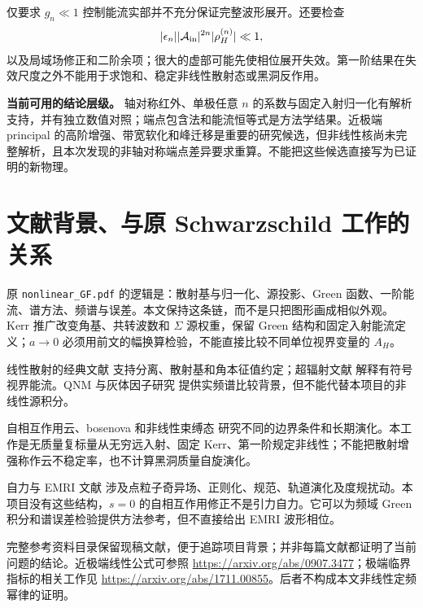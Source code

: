\documentclass[UTF8,fontset=fandol,11pt,a4paper,oneside]{ctexart}
\numberwithin{equation}{section}
\begin{document}
仅要求 $g_n\ll1$ 控制能流实部并不充分保证完整波形展开。还要检查
\begin{equation}
|\epsilon_n||\mathcal A_{\rm in}|^{2n}|\rho_H^{(n)}|\ll1,
\end{equation}
以及局域场修正和二阶余项；很大的虚部可能先使相位展开失效。第一阶结果在失效尺度之外不能用于求饱和、稳定非线性散射态或黑洞反作用。

\begin{note}
\textbf{当前可用的结论层级。} 轴对称红外、单极任意 $n$ 的系数与固定入射归一化有解析支持，并有独立数值对照；端点包含法和能流恒等式是方法学结果。近极端 principal 的高阶增强、带宽软化和峰迁移是重要的研究候选，但非线性核尚未完整解析，且本次发现的非轴对称端点差异要求重算。不能把这些候选直接写为已证明的新物理。
\end{note}

\section{文献背景、与原 Schwarzschild 工作的关系}
原 \texttt{nonlinear\_GF.pdf} 的逻辑是：散射基与归一化、源投影、Green 函数、一阶能流、谱方法、频谱与误差。本文保持这条链，而不是只把图形画成相似外观。Kerr 推广改变角基、共转波数和 $\Sigma$ 源权重，保留 Green 结构和固定入射能流定义；$a\to0$ 必须用前文的幅换算检验，不能直接比较不同单位视界变量的 $A_H$。

线性散射的经典文献\cite{Sanchez1976,Futterman,GlampedakisAndersson2001,Teukolsky1973} 支持分离、散射基和角本征值约定；超辐射文献\cite{PressTeukolsky,StarobinskyChurilov} 解释有符号视界能流。QNM 与灰体因子研究\cite{Berti2009,Oshita2023,Oshita2024} 提供实频谱比较背景，但不能代替本项目的非线性源积分。

自相互作用云、bosenova 和非线性束缚态\cite{YoshinoKodama2012,HerdeiroQCloud2014,Baryakhtar2021} 研究不同的边界条件和长期演化。本工作是无质量复标量从无穷远入射、固定 Kerr、第一阶规定非线性；不能把散射增强称作云不稳定率，也不计算黑洞质量自旋演化。

自力与 EMRI 文献\cite{BarackPound2019,PoundWardell2021} 涉及点粒子奇异场、正则化、规范、轨道演化及度规扰动。本项目没有这些结构，$s=0$ 的自相互作用修正不是引力自力。它可以为频域 Green 积分和谱误差检验提供方法参考，但不直接给出 EMRI 波形相位。

完整参考资料目录保留现稿文献，便于追踪项目背景；并非每篇文献都证明了当前问题的结论。近极端线性公式可参照 \url{https://arxiv.org/abs/0907.3477}；极端临界指标的相关工作见 \url{https://arxiv.org/abs/1711.00855}。后者不构成本文非线性定频幂律的证明。
\end{document}
